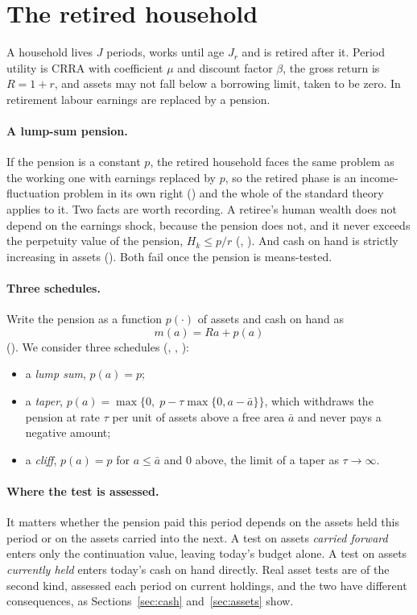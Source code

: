 \section{The retired household}\label{sec:model}

A household lives $J$ periods, works until age $J_r$ and is retired after it. Period utility is
CRRA with coefficient $\mu$ and discount factor $\beta$, the gross return is $R=1+r$, and assets
may not fall below a borrowing limit, taken to be zero. In retirement labour earnings are replaced
by a pension.

\paragraph{A lump-sum pension.} If the pension is a constant $p$, the retired household faces the
same problem as the working one with earnings replaced by $p$, so the retired phase is an
income-fluctuation problem in its own right () and the whole of the standard
theory applies to it. Two facts are worth recording. A retiree's human wealth does not depend on
the earnings shock, because the pension does not, and it never exceeds the perpetuity value of the
pension, $H_k\le p/r$ (,
). And cash on hand is strictly increasing in assets
(). Both fail once the pension is means-tested.

\paragraph{Three schedules.} Write the pension as a function $p(\cdot)$ of assets and cash on hand
as
\[
  m(a)=Ra+p(a)
\]
(). We consider three schedules (, , ):
\begin{itemize}[leftmargin=1.5em]
\item a \emph{lump sum}, $p(a)=p$;
\item a \emph{taper}, $p(a)=\max\{0,\;p-\tau\max\{0,a-\bar a\}\}$, which withdraws the pension at
  rate $\tau$ per unit of assets above a free area $\bar a$ and never pays a negative amount;
\item a \emph{cliff}, $p(a)=p$ for $a\le\bar a$ and $0$ above, the limit of a taper as
  $\tau\to\infty$.
\end{itemize}

\paragraph{Where the test is assessed.} It matters whether the pension paid this period depends on
the assets held this period or on the assets carried into the next. A test on assets \emph{carried
forward} enters only the continuation value, leaving today's budget alone. A test on assets
\emph{currently held} enters today's cash on hand directly. Real asset tests are of the second
kind, assessed each period on current holdings, and the two have different consequences, as
Sections~\ref{sec:cash} and~\ref{sec:assets} show.

